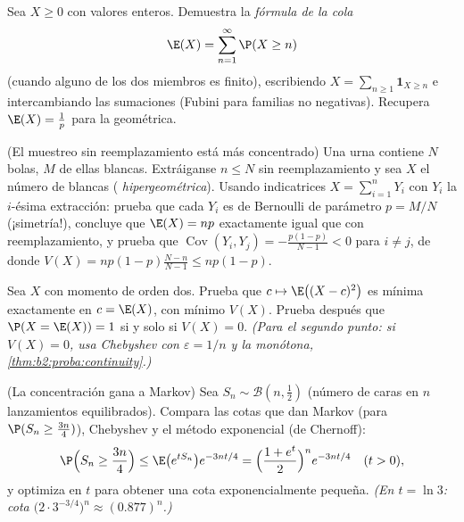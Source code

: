 \begin{exercise}[$\star\star$]\label{exo:b2:randomvar:4}
Sea $X \geq 0$ con valores enteros. Demuestra la \emph{fórmula de la
cola}
\[
\E(X) = \sum_{n=1}^{\infty} \P(X \geq n)
\]
(cuando alguno de los dos miembros es finito), escribiendo $X =
\sum_{n\geq1}\mathbf{1}_{X \geq n}$ e intercambiando las sumaciones
(Fubini para familias no negativas). Recupera $\E(X) = \frac1p$ para
la  geométrica.
\end{exercise}

\begin{exercise}[$\star\star$]\label{exo:b2:randomvar:5}
(El muestreo sin reemplazamiento está más concentrado) Una urna
contiene $N$ bolas, $M$ de ellas blancas. Extráiganse $n \leq N$ sin
reemplazamiento y sea $X$ el número de blancas (
\emph{hipergeométrica}). Usando indicatrices $X = \sum_{i=1}^n Y_i$
con $Y_i$ la $i$-ésima extracción: prueba que cada $Y_i$ es de
Bernoulli de parámetro $p = M/N$ (¡simetría!), concluye que $\E(X) =
np$ exactamente igual que con reemplazamiento, y prueba que
$\operatorname{Cov}(Y_i, Y_j) = -\frac{p(1-p)}{N-1} < 0$ para $i \neq
j$, de donde $V(X) = np(1-p)\frac{N - n}{N - 1} \leq np(1-p)$.
\end{exercise}

\begin{exercise}[$\star\star$]\label{exo:b2:randomvar:6}
Sea $X$ con momento de orden dos. Prueba que $c \mapsto \E\bigl((X -
c)^2\bigr)$ es mínima exactamente en $c = \E(X)$, con mínimo $V(X)$.
Prueba después que $\P(X = \E(X)) = 1$ si y solo si $V(X) = 0$.
\emph{(Para el segundo punto: si $V(X) = 0$, usa Chebyshev con
$\varepsilon = 1/n$ y la  monótona,
\cref{thm:b2:proba:continuity}.)}
\end{exercise}

\begin{exercise}[$\star\star\star$]\label{exo:b2:randomvar:7}
(La concentración gana a Markov) Sea $S_n \sim \mathcal{B}(n,
\frac12)$ (número de caras en $n$ lanzamientos equilibrados). Compara
las cotas que dan Markov (para $\P(S_n \geq \frac{3n}{4})$),
Chebyshev y el método exponencial (de Chernoff):
\[
\P\Bigl(S_n \geq \frac{3n}4\Bigr)
\leq \E\bigl(e^{tS_n}\bigr)e^{-3nt/4}
= \Bigl(\frac{1 + e^t}{2}\Bigr)^n e^{-3nt/4}
\quad (t > 0),
\]
y optimiza en $t$ para obtener una cota exponencialmente pequeña.
\emph{(En $t = \ln 3$: cota $\bigl(2\cdot 3^{-3/4}\bigr)^n \approx
(0.877)^n$.)}
\end{exercise}

